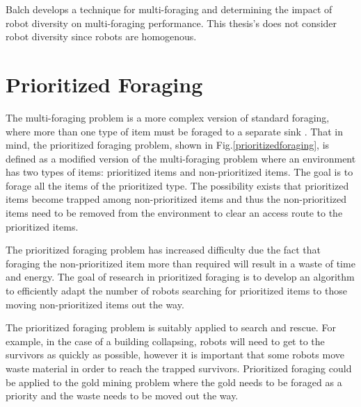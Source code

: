 Balch \cite{balch1999impact} develops a technique for multi-foraging and determining the impact of robot diversity on multi-foraging performance. This thesis's does not consider robot diversity since robots are homogenous.



\section{Prioritized Foraging}
\label{sec:second:prioritizedforaging}


The multi-foraging problem is a more complex version of standard foraging, where more than one type of item must be foraged to a separate sink \cite{balch1999impact}. That in mind, the prioritized foraging problem, shown in Fig.\ref{prioritizedforaging}, is defined as a modified version of the multi-foraging problem where an environment has two types of items: prioritized items and non-prioritized items. The goal is to forage all the items of the prioritized type. The possibility exists that prioritized items become trapped among non-prioritized items and thus the non-prioritized items need to be removed from the environment to clear an access route to the prioritized items. 

The prioritized foraging problem has increased difficulty due the fact that  foraging the non-prioritized item more than required will result in a waste of time and energy. The goal of research in prioritized foraging is to develop an algorithm to efficiently adapt the number of robots searching for prioritized items to those moving non-prioritized items out the way. 

The prioritized foraging problem is suitably applied to search and rescue. For example, in the case of a building collapsing, robots will need to get to the survivors as quickly as possible, however it is important that some robots move waste material in order to reach the trapped survivors. Prioritized foraging could be applied to the gold mining problem where the gold needs to be foraged as a priority and the waste needs to be moved out the way.


